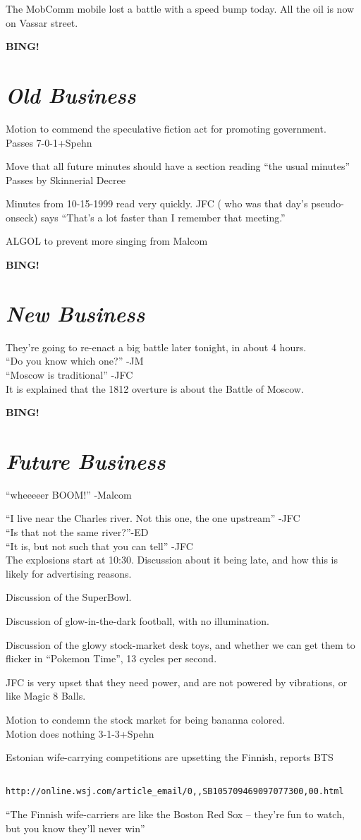 \documentclass[12pt]{article}
\newcommand{\bing}{{\bf BING!} }
\newcommand{\goto}[1]{\bing \vskip 12pt \section*{{\em{#1}}}}
\begin{document}
The MobComm mobile lost a battle with a speed bump today. All the oil
is now on Vassar street.

\goto{Old Business}

Motion to commend the speculative fiction act for promoting government.\\
Passes 7-0-1+Spehn

Move that all future minutes should have a section reading ``the usual
minutes''\\
Passes by Skinnerial Decree

Minutes from 10-15-1999 read very quickly.  JFC ( who was that day's
pseudo-onseck) says ``That's a lot faster than I remember that
meeting.''

ALGOL to prevent more singing from Malcom

\goto{New Business}
They're going to re-enact a big battle later tonight, in about 4
hours.\\
``Do you know which one?'' -JM\\
``Moscow is traditional'' -JFC\\
It is explained that the 1812 overture is about the Battle of Moscow.

\goto{Future Business}

``wheeeeer BOOM!'' -Malcom

``I live near the Charles river. Not this one, the one upstream'' -JFC\\
``Is that not the same river?''-ED\\
``It is, but not such that you can tell'' -JFC\\

The explosions start at 10:30. Discussion about it being late, and how
this is likely for advertising reasons.

Discussion of the SuperBowl.

Discussion of glow-in-the-dark football, with no illumination.

Discussion of the glowy stock-market desk toys, and whether we can get
them to flicker in ``Pokemon Time'', 13 cycles per second.

JFC is very upset that they need power, and are not powered by
vibrations, or like Magic 8 Balls.

Motion to condemn the stock market for being bananna colored.\\
Motion does nothing 3-1-3+Spehn

Estonian wife-carrying competitions are upsetting the Finnish, reports BTS\\
\begin{verbatim}       http://online.wsj.com/article_email/0,,SB105709469097077300,00.html\end{verbatim}
``The Finnish wife-carriers are like the Boston Red Sox -- they're fun
to watch, but you know they'll never win'' 
\end{document}
